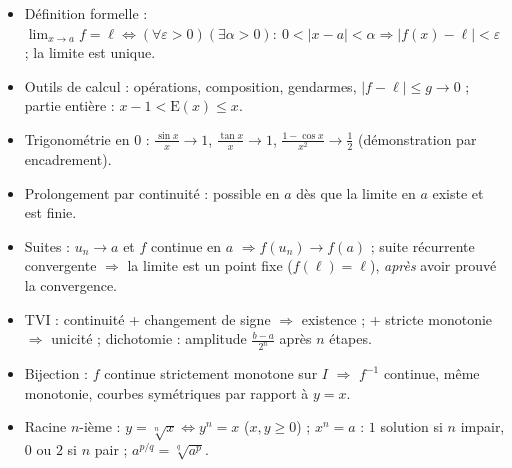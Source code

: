 \documentclass[11pt,a4paper]{article}
\newcommand{\E}{\mathrm{E}}
\begin{document}
\vspace{4mm}
\begin{tcolorbox}[
  enhanced, boxrule=0pt, arc=2mm,
  interior style={left color=qtealdark, right color=qteal},
  left=6mm, right=6mm, top=4mm, bottom=4mm,
  fontupper=\color{white}\sffamily,
  title={\sffamily\bfseries\color{white}\ding{72}~~À retenir},
  colbacktitle=qtealdark, coltitle=white, boxrule=0pt
]
\begin{itemize}[leftmargin=6mm, label={\color{qamber}}, itemsep=1mm]
  \item Définition formelle : $\lim_{x\to a} f = \ell \iff (\forall\varepsilon>0)(\exists\alpha>0):\ 0<|x-a|<\alpha \Rightarrow |f(x)-\ell|<\varepsilon$ ; la limite est unique.
  \item Outils de calcul : opérations, composition, gendarmes, $|f - \ell| \leq g \to 0$ ; partie entière : $x - 1 < \E(x) \leq x$.
  \item Trigonométrie en $0$ : $\frac{\sin x}{x} \to 1$, $\frac{\tan x}{x} \to 1$, $\frac{1 - \cos x}{x^2} \to \frac{1}{2}$ (démonstration par encadrement).
  \item Prolongement par continuité : possible en $a$ dès que la limite en $a$ existe et est finie.
  \item Suites : $u_n \to a$ et $f$ continue en $a$ $\Rightarrow f(u_n) \to f(a)$ ; suite récurrente convergente $\Rightarrow$ la limite est un point fixe ($f(\ell) = \ell$), \emph{après} avoir prouvé la convergence.
  \item TVI : continuité + changement de signe $\Rightarrow$ existence ; + stricte monotonie $\Rightarrow$ unicité ; dichotomie : amplitude $\frac{b-a}{2^n}$ après $n$ étapes.
  \item Bijection : $f$ continue strictement monotone sur $I$ $\Rightarrow$ $f^{-1}$ continue, même monotonie, courbes symétriques par rapport à $y = x$.
  \item Racine $n$-ième : $y = \sqrt[n]{x} \iff y^n = x$ ($x, y \geq 0$) ; $x^n = a$ : $1$ solution si $n$ impair, $0$ ou $2$ si $n$ pair ; $a^{p/q} = \sqrt[q]{a^p}$.
\end{itemize}
\end{tcolorbox}
\end{document}
